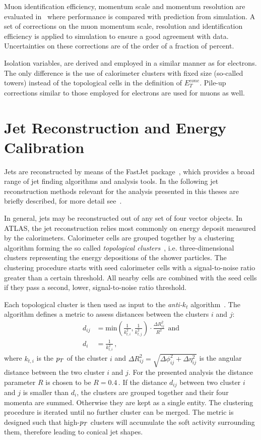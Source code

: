 Muon identification efficiency, momentum scale and momentum resolution are evaluated in~\cite{muoneffres} where 
performance is compared with prediction from simulation. A set of corrections on the muon momentum scale, resolution and identification efficiency 
is applied to simulation to ensure a good agreement with data. Uncertainties on these corrections are of the order of a fraction of percent.

Isolation variables, are derived and employed in a similar manner  as  for electrons. The only difference
is the use of calorimeter clusters with fixed size (so-called towers) instead of the topological cells 
in the definition of $E_T^{cone}$. Pile-up corrections similar to those employed for electrons are used for muons as well.  



\section{Jet Reconstruction and Energy Calibration}
Jets are reconstructed  by means of the FastJet package~\cite{fastjet}, 
which provides a broad range of jet finding algorithms and analysis tools. 
In the following jet reconstruction methods relevant for the
analysis presented in this theses are briefly described, for more detail see~\cite{AtlasCSCBook}.

In general, jets may be reconstructed out of any set of four vector objects. 
In ATLAS, the jet reconstruction relies most commonly on energy deposit measured by the calorimeters.
Calorimeter cells are grouped together by a clustering algorithm forming the so called \emph{topological clusters}~\cite{TopoClusterAlgo},
i.e. three-dimensional clusters representing the energy depositions of the shower particles.
The clustering procedure starts with seed calorimeter cells with a signal-to-noise ratio greater than a certain threshold. 
All nearby cells are combined with the seed cells if they pass a second, lower, signal-to-noise ratio threshold.

Each topological cluster is then used as  input  to the \emph{anti-$k_t$} algorithm~\cite{antikt}. The algorithm defines a metric
to assess distances between the clusters $i$ and $j$:
\begin{align}
d_{ij} &= \text{min}(\frac{1}{k_{t,i}^2}, \frac{1}{k_{t,j}^2}) \cdot \frac{\Delta R_{ij}^2}{R^2}  ~ ~ \text{and}\\
d_i   &= \frac{1}{k_{t,i}^2} \, ,
\end{align}
where $k_{t,i}$ is the $p_{T}$ of the cluster $i$ and $\Delta R_{ij}^2 = \sqrt{\Delta\phi_{ij}^2 + \Delta\eta_{ij}^2}$
is the angular distance between the two cluster $i$ and $j$. For
the presented  analysis the distance parameter $R$ is chosen to be $R=0.4\,$.
If the distance $d_{ij}$ between two cluster $i$ and $j$  is smaller than $d_i$, the clusters are grouped together and their four momenta are
summed. Otherwise they are kept as a single entity. The clustering procedure is iterated until no further cluster can be merged. 
The metric is designed such  that high-$p_{T}$ clusters will accumulate the soft activity surrounding them, therefore leading to conical
jet shapes. 

